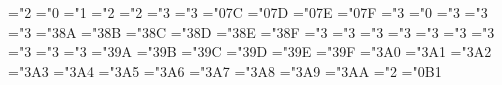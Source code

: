 { \def\hmsurd{{\mathchar"1\mthsy@@70}}%
 \mathchardef\hmamalg="2
 \mathchardef\hmnabla="0
 \mathchardef\hmsmallint="1
 \mathchardef\hmsqcup="2
 \mathchardef\hmsqcap="2
 \mathchardef\hmsqsubseteq="3
 \mathchardef\hmsqsupseteq="3
 \mathchardef\hmclubsuit="0\mthsy@@7C
 \mathchardef\hmdiamondsuit="0\mthsy@@7D
 \mathchardef\hmheartsuit="0\mthsy@@7E
 \mathchardef\hmspadesuit="0\mthsy@@7F
 \mathchardef\hmnotin="3
 \mathchardef\hmangle="0
 \mathchardef\hmdoteq="3
 \mathchardef\hmmodels="3
 \mathchardef\hmbowtie="3
 \mathchardef\hmcong="3\mthsy@@8A
 \mathchardef\hmhookleftarrow="3\mthsy@@8B
 \mathchardef\hmhookrightarrow="3\mthsy@@8C
 \mathchardef\hmlongleftarrow="3\mthsy@@8D
 \mathchardef\hmlongrightarrow="3\mthsy@@8E
 \mathchardef\hmLongleftarrow="3\mthsy@@8F
 \mathchardef\hmLongrightarrow="3
 \mathchardef\hmmapsto="3
 \mathchardef\hmlongmapsto="3
 \mathchardef\hmlongleftrightarrow="3
 \mathchardef\hmLongleftrightarrow="3
 \def\hmiff{\;\hmLongleftrightarrow\;}%
 \mathchardef\hmrightleftharpoons="3
 \mathchardef\hmnotless="3
 \mathchardef\hmnotleq="3
 \mathchardef\hmnotprec="3
 \mathchardef\hmnotpreceq="3
 \mathchardef\hmnotsubset="3\mthsy@@9A
 \mathchardef\hmnotsubseteq="3\mthsy@@9B
 \mathchardef\hmnotsqsubseteq="3\mthsy@@9C
 \mathchardef\hmnotgr="3\mthsy@@9D
 \mathchardef\hmnotgeq="3\mthsy@@9E
 \mathchardef\hmnotsucc="3\mthsy@@9F
 \mathchardef\hmnotsucceq="3\mthsy@@ A0
 \mathchardef\hmnotsupset="3\mthsy@@ A1
 \mathchardef\hmnotsupseteq="3\mthsy@@ A2
 \mathchardef\hmnotsqsupseteq="3\mthsy@@ A3
 \mathchardef\hmneq="3\mthsy@@ A4 \let\hmne=\hmneq
 \mathchardef\hmnotequiv="3\mthsy@@ A5
 \mathchardef\hmnotsim="3\mthsy@@ A6
 \mathchardef\hmnotsimeq="3\mthsy@@ A7
 \mathchardef\hmnotapprox="3\mthsy@@ A8
 \mathchardef\hmnotcong="3\mthsy@@ A9
 \mathchardef\hmnotasymp="3\mthsy@@ AA
 \mathchardef\hmangle="2
 \mathchardef\hmdigamma="0\mthsy@@ B1
 \def\hmgrave{\ifnum\fam=\m@ne\mathaccent"0\mthsy@@4A \else\@grave@\fi}%
 \def\hmacute{\ifnum\fam=\m@ne\mathaccent"0\mthsy@@4B \else\@acute@\fi}%
 \def\hmcheck{\ifnum\fam=\m@ne\mathaccent"0\mthsy@@4C \else\@check@\fi}%
 \def\hmbreve{\ifnum\fam=\m@ne\mathaccent"0\mthsy@@4D \else\@breve@\fi}%
 \def\hmbar{\ifnum\fam=\m@ne\mathaccent"0\mthsy@@4E \else\@bar@\fi}%
 \def\hmhat{\ifnum\fam=\m@ne\mathaccent"0\mthsy@@4F \else\@hat@\fi}%
 \def\hmdot{\ifnum\fam=\m@ne\mathaccent"0\mthsy@@50 \else\@dot@\fi}%
 \def\hmtilde{\ifnum\fam=\m@ne\mathaccent"0\mthsy@@51 \else\@tilde@\fi}%
}

